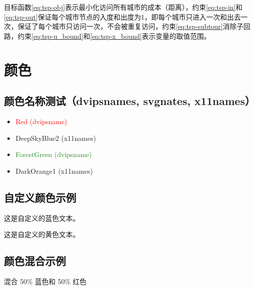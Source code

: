 \documentclass[fontset=none]{ctexart}
\begin{document}
目标函数\eqref{eq:tsp-obj}表示最小化访问所有城市的成本（距离），约束\eqref{eq:tsp-in}和\eqref{eq:tsp-out}保证每个城市节点的入度和出度为1，即每个城市只进入一次和出去一次，保证了每个城市只访问一次，不会被重复访问，约束\eqref{eq:tsp-subtour}消除子回路，约束\eqref{eq:tsp-u_bound}和\eqref{eq:tsp-x_bound}表示变量的取值范围。

\section{颜色}

\subsection{颜色名称测试（dvipsnames, svgnates, x11names）}

\begin{itemize}
    \item \textcolor{Red}{Red (dvipsname)}
    \item \textcolor{DeepSkyBlue2}{DeepSkyBlue2 (x11names)}
    \item \textcolor{ForestGreen}{ForestGreen (dvipsname)}
    \item \textcolor{DarkOrange1}{DarkOrange1 (x11names)}
\end{itemize}

\subsection{自定义颜色示例}


\textcolor{MyBlue}{这是自定义的蓝色文本。}

\textcolor{MyYellow}{这是自定义的黄色文本。}

\subsection{颜色混合示例}

\textcolor{blue!50!red}{混合 50\% 蓝色和 50\% 红色}
\end{document}
